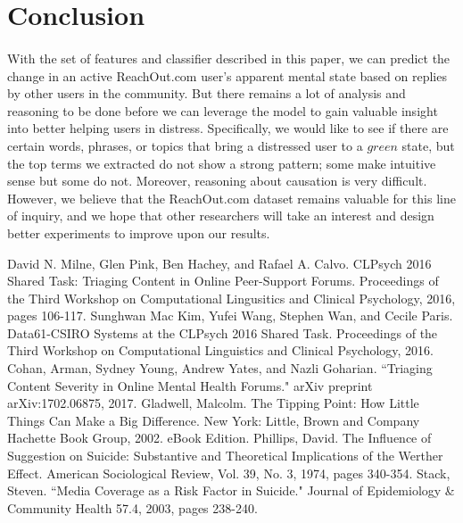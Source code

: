 \documentclass{article}
\begin{document}
\section{Conclusion}

\paragraph{}With the set of features and classifier described in this paper, we can predict the change in an active ReachOut.com user's apparent mental state based on replies by other users in the community. But there remains a lot of analysis and reasoning to be done before we can leverage the model to gain valuable insight into better helping users in distress. Specifically, we would like to see if there are certain words, phrases, or topics that bring a distressed user to a $green$ state, but the top terms we extracted do not show a strong pattern; some make intuitive sense but some do not. Moreover, reasoning about causation is very difficult. However, we believe that the ReachOut.com dataset remains valuable for this line of inquiry, and we hope that other researchers will take an interest and design better experiments to improve upon our results.

\begin{thebibliography}{9}

	David N. Milne, Glen Pink, Ben Hachey, and Rafael A. Calvo. CLPsych 2016 Shared Task: Triaging Content in Online Peer-Support Forums. Proceedings of the Third Workshop on Computational Lingusitics and Clinical Psychology, 2016, pages 106-117.
	Sunghwan Mac Kim, Yufei Wang, Stephen Wan, and Cecile Paris. Data61-CSIRO Systems at the CLPsych 2016 Shared Task. Proceedings of the Third Workshop on Computational Linguistics and Clinical Psychology, 2016.
        Cohan, Arman, Sydney Young, Andrew Yates, and Nazli Goharian. ``Triaging Content Severity in Online Mental Health Forums." arXiv preprint arXiv:1702.06875, 2017.
        Gladwell, Malcolm. The Tipping Point: How Little Things Can Make a Big Difference. New York: Little, Brown and Company Hachette Book Group, 2002. eBook Edition.
        Phillips, David. The Influence of Suggestion on Suicide: Substantive and Theoretical Implications of the Werther Effect. American Sociological Review, Vol. 39, No. 3, 1974, pages 340-354.
        Stack, Steven. ``Media Coverage as a Risk Factor in Suicide." Journal of Epidemiology \& Community Health 57.4, 2003, pages 238-240.

\end{thebibliography}
\end{document}
